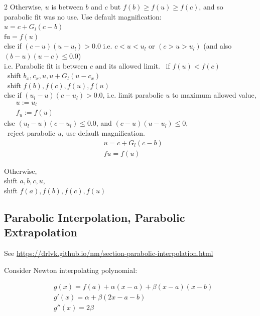 \documentclass[10pt]{amsart}
\begin{document}
\begin{multicols*}{2}
Otherwise, $u$ is between $b$ and $c$ but $f(b) \geq f(u) \geq f(c)$, and so \\
parabolic fit was no use. Use default magnification: \\
$ u = c + G_l (c-b)$ \\
$\text{fu} = f(u)$ \\

else if $(c-u)(u - u_l) > 0.0$ i.e. $c < u < u_l$ or $(c > u > u_l)$ (and also $(b-u)(u-c) \leq 0.0$) \\ i.e. Parabolic fit is between $c$ and its allowed limit.
\quad \, if $f(u) < f(c)$ \\
\quad \quad \, shift $b_x, c_x, u, u + G_l(u-c_x)$ \\
\quad \quad \, shift $f(b), f(c), f(u), f(u)$ \\

else if $(u_l -u)(c-u_l) > 0.0$, i.e. limit parabolic $u$ to maximum allowed value, \\
\quad \, $\begin{aligned}
& u := u_l \\
& f_u := f(u) 
\end{aligned}$ \\

else $(u_l - u)(c- u_l) \leq 0.0$, and $(c-u)(u - u_l) \leq 0$, \\
\quad \, reject parabolic $u$, use default magnification. \\
\[
\begin{aligned}
& u = c + G_l (c-b) \\
& fu = f(u)
\end{aligned}
\]

Otherwise, \\
shift $a,b,c, u$, \\
shift $f(a), f(b), f(c), f(u)$ \\

\subsection{Parabolic Interpolation, Parabolic Extrapolation}

See \href{Numerical Methods with Programming, Leonid Kovalev}{https://drlvk.github.io/nm/section-parabolic-interpolation.html}

Consider Newton interpolating polynomial:

\begin{equation}
\begin{aligned}
& g(x) = f(a) + \alpha(x-a) + \beta(x-a)(x-b) \\
& g'(x) = \alpha + \beta( 2x - a- b) \\
& g''(x) = 2\beta
\end{aligned}
\end{equation}


\end{multicols*}
\end{document}
